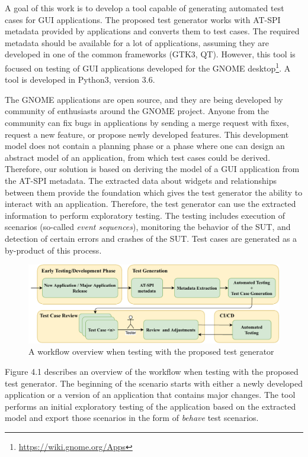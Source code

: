 A goal of this work is to develop a tool capable of generating automated test cases for GUI applications. The proposed test generator works with AT-SPI metadata provided by applications and converts them to test cases. The required metadata should be available for a lot of applications, assuming they are developed in one of the common frameworks (GTK3, QT). However, this tool is focused on testing of GUI applications developed for the GNOME desktop\footnote{\url{https://wiki.gnome.org/Apps}}. A tool is developed in Python3, version 3.6.

The GNOME applications are open source, and they are being developed by community of enthusiasts around the GNOME project. Anyone from the community can fix bugs in applications by sending a merge request with fixes, request a new feature, or propose newly developed features. This development model does not contain a planning phase or a phase where one can design an abstract model of an application, from which test cases could be derived. Therefore, our solution is based on deriving the model of a GUI application from the AT-SPI metadata. The extracted data about widgets and relationships between them provide the foundation which gives the test generator the ability to interact with an application. Therefore, the test generator can use the extracted information to perform exploratory testing. The testing includes execution of scenarios (so-called \textit{event sequences}), monitoring the behavior of the SUT, and detection of certain errors and crashes of the SUT. Test cases are generated as a by-product of this process.

\begin{figure}[hbt!]
	\centering
	\includegraphics[width=1\textwidth]{obrazky-figures/overview.pdf}
	\caption{A workflow overview when testing with the proposed test generator}
	\label{Diagram}
\end{figure}

Figure 4.1 describes an overview of the workflow when testing with the proposed test generator. The beginning of the scenario starts with either a newly developed application or a version of an application that contains major changes. The tool performs an  initial exploratory testing of the application based on the extracted model and export those scenarios in the form of \textit{behave} test scenarios.

